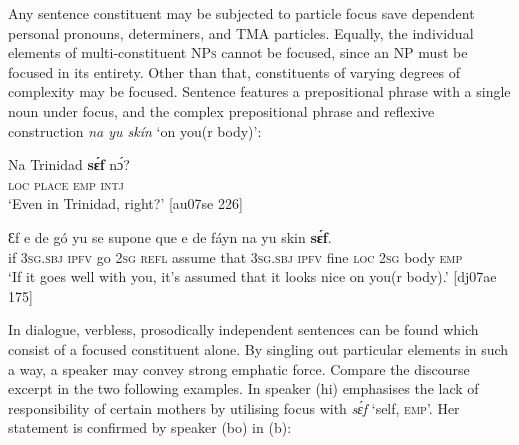 Any sentence constituent may be subjected to particle focus save dependent personal pronouns, determiners, and \textsc{TMA} particles. Equally, the individual elements of multi-constituent \textsc{NPs} cannot be focused, since an \textsc{NP} must be focused in its entirety. Other than that, constituents of varying degrees of complexity may be focused. Sentence  features a prepositional phrase with a single noun under focus, and  the complex prepositional phrase and reflexive construction \textit{na yu skín} ‘on you(r body)’:


\ea%
    \label{ex:key:673}
    \gll Na  Trinidad  \textbf{sɛ́f}  nɔ́?\\
\textsc{loc}  \textsc{place}    \textsc{emp}  \textsc{intj}\\

\glt ‘Even in Trinidad, right?’ [au07se 226]
\z


\ea%
    \label{ex:key:674}
    \gll Ɛf  e    de  gó  yu  se  supone  que  e  de  fáyn
na  yu  skin    \textbf{sɛ́f}.\\
if  \textsc{3sg.sbj}  \textsc{ipfv}  go  \textsc{2sg}  \textsc{refl}  assume  that  \textsc{3sg.sbj}  \textsc{ipfv}  fine
\textsc{loc}  \textsc{2sg}  body  \textsc{emp}\\

\glt ‘If it goes well with you, it’s assumed that it looks nice on you(r body).’ [dj07ae 175]
\z

In dialogue, verbless, prosodically independent sentences can be found which consist of a focused constituent alone. By singling out particular elements in such a way, a speaker may convey strong emphatic force. Compare the discourse excerpt in the two following examples. In  speaker (hi) emphasises the lack of responsibility of certain mothers by utilising focus with \textit{sɛ́f} ‘self, \textsc{emp}’. Her statement is confirmed by speaker (bo) in (b):


\ea%
    \label{ex:key:675}
\z\z

